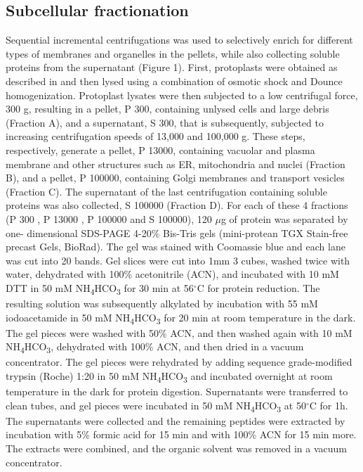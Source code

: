 \subsection*{Subcellular fractionation}

Sequential incremental centrifugations was used to selectively enrich for different types of
membranes and organelles in the pellets, while also collecting soluble proteins from the
supernatant (Figure 1). First, protoplasts were obtained as described in \citep{Pitarch2006} and
then lysed using a combination of osmotic shock and Dounce homogenization. Protoplast
lysates were then subjected to a low centrifugal force, 300 g, resulting in a pellet, P 300,
containing unlysed cells and large debris (Fraction A), and a supernatant, S 300, that is
subsequently, subjected to increasing centrifugation speeds of 13,000 and 100,000 g. These
steps, respectively, generate a pellet, P 13000, containing vacuolar and plasma membrane and
other structures such as ER, mitochondria and nuclei (Fraction B), and a pellet, P 100000,
containing Golgi membranes and transport vesicles (Fraction C). The supernatant of the last
centrifugation containing soluble proteins was also collected, S 100000 (Fraction D). For each of
these 4 fractions (P 300 , P 13000 , P 100000 and S 100000), 120 $\mu$g of protein was separated by one-
dimensional SDS-PAGE 4-20\% Bis-Tris gels (mini-protean TGX Stain-free precast Gels,
BioRad). The gel was stained with Coomassie blue and each lane was cut into 20 bands. Gel
slices were cut into 1mm 3 cubes, washed twice with water, dehydrated with 100\% acetonitrile
(ACN), and incubated with 10 mM DTT in 50 mM NH\textsubscript{4}HCO\textsubscript{3} for 30 min at 56$^{\circ}$C for protein
reduction. The resulting solution was subsequently alkylated by incubation with 55 mM
iodoacetamide in 50 mM NH\textsubscript{4}HCO\textsubscript{3} for 20 min at room temperature in the dark. The gel
pieces were washed with 50\% ACN, and then washed again with 10 mM NH\textsubscript{4}HCO\textsubscript{3},
dehydrated with 100\% ACN, and then dried in a vacuum concentrator. The gel pieces were
rehydrated by adding sequence grade-modified trypsin (Roche) 1:20 in 50 mM NH\textsubscript{4}HCO\textsubscript{3} and
incubated overnight at room temperature in the dark for protein digestion. Supernatants were
transferred to clean tubes, and gel pieces were incubated in 50 mM NH\textsubscript{4}HCO\textsubscript{3} at 50$^{\circ}$C for
1h. The supernatants were collected and the remaining peptides were extracted by
incubation with 5\% formic acid for 15 min and with 100\% ACN for 15 min more. The extracts
were combined, and the organic solvent was removed in a vacuum concentrator.


